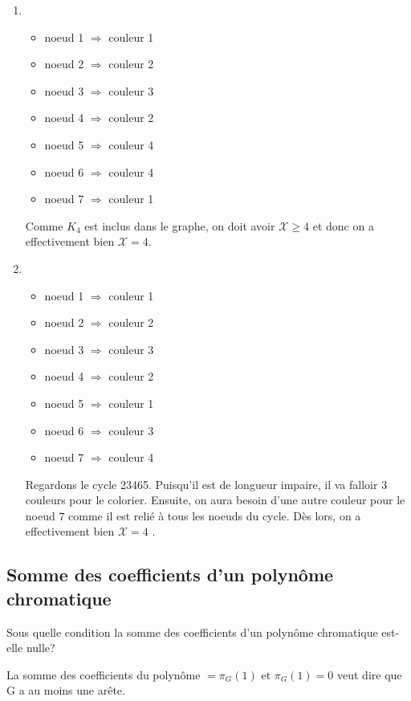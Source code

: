 \begin{solution}
  \begin{enumerate}
    \item 
    \begin{itemize}
    \item noeud 1 $\Rightarrow$ couleur 1
    \item noeud 2 $\Rightarrow$ couleur 2
    \item noeud 3 $\Rightarrow$ couleur 3
    \item noeud 4 $\Rightarrow$ couleur 2
    \item noeud 5 $\Rightarrow$ couleur 4
    \item noeud 6 $\Rightarrow$ couleur 4
    \item noeud 7 $\Rightarrow$ couleur 1
    \end{itemize}
    Comme $K_4$ est inclus dans le graphe, on doit avoir $\mathcal{X} \geq 4$  et donc on a effectivement bien $\mathcal{X} = 4$.
    \item
    \begin{itemize}
    \item noeud 1 $\Rightarrow$ couleur 1
    \item noeud 2 $\Rightarrow$ couleur 2
    \item noeud 3 $\Rightarrow$ couleur 3
    \item noeud 4 $\Rightarrow$ couleur 2
    \item noeud 5 $\Rightarrow$ couleur 1
    \item noeud 6 $\Rightarrow$ couleur 3
    \item noeud 7 $\Rightarrow$ couleur 4
    \end{itemize}
    Regardons le cycle 23465. Puisqu'il est de longueur impaire, il va falloir 3 couleurs pour le colorier. Ensuite, on aura besoin d'une autre couleur pour le noeud $7$ comme il est relié à tous les noeuds du cycle. Dès lors, on a effectivement bien $\mathcal{X} = 4$ .
     \end{enumerate}
\end{solution}

\subsection{Somme des coefficients d'un polynôme chromatique}
Sous quelle condition la somme des coefficients d'un polynôme chromatique est-elle nulle?

\begin{solution}
  La somme des coefficients du polynôme $= \pi_G(1)$ et $\pi_G(1) = 0$ veut dire que G a au moins une arête.
\end{solution}

